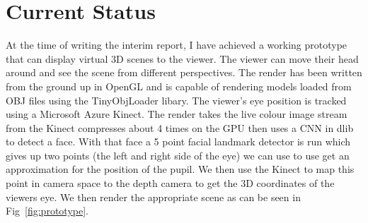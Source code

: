 \section{Current Status}
At the time of writing the interim report, I have achieved a working prototype that can display virtual 3D scenes to the viewer. The viewer can move their head around and see the scene from different perspectives. The render has been written from the ground up in OpenGL and is capable of rendering models loaded from OBJ files using the TinyObjLoader libary. The viewer's eye position is tracked using a Microsoft Azure Kinect. The render takes the live colour image stream from the Kinect compresses about 4 times on the GPU then uses a CNN in dlib to detect a face. With that face a 5 point facial landmark detector is run which gives up two points (the left and right side of the eye) we can use to use get an approximation for the position of the pupil. We then use the Kinect to map this point in camera space to the depth camera to get the 3D coordinates of the viewers eye. We then render the appropriate scene as can be seen in Fig~\ref{fig:prototype}.

